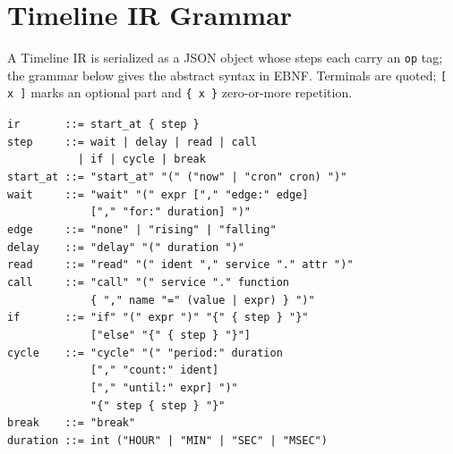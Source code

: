\documentclass[sigconf,nonacm,anonymous,review]{acmart}
\begin{document}
\balance



\appendix

\section{Timeline IR Grammar}
\label{app:grammar}

A Timeline IR is serialized as a JSON object whose steps each carry an \texttt{op} tag; the grammar below gives the abstract syntax in EBNF. Terminals are quoted; \texttt{[\,x\,]} marks an optional part and \texttt{\{\,x\,\}} zero-or-more repetition.

{\small
\begin{flushleft}
\texttt{ir \ \ \ \ \ \ ::= start\_at \{ step \}}\\
\texttt{step \ \ \ \ ::= wait | delay | read | call}\\
\texttt{\ \ \ \ \ \ \ \ \ \ \ | if | cycle | break}\\[3pt]
\texttt{start\_at ::= "start\_at" "(" ("now" | "cron" cron) ")"}\\
\texttt{wait \ \ \ \ ::= "wait" "(" expr ["," "edge:" edge]}\\
\texttt{\ \ \ \ \ \ \ \ \ \ \ \ \ ["," "for:" duration] ")"}\\
\texttt{edge \ \ \ \ ::= "none" | "rising" | "falling"}\\
\texttt{delay \ \ \ ::= "delay" "(" duration ")"}\\
\texttt{read \ \ \ \ ::= "read" "(" ident "," service "." attr ")"}\\
\texttt{call \ \ \ \ ::= "call" "(" service "." function}\\
\texttt{\ \ \ \ \ \ \ \ \ \ \ \ \ \{ "," name "=" (value | expr) \} ")"}\\
\texttt{if \ \ \ \ \ \ ::= "if" "(" expr ")" "\{" \{ step \} "\}"}\\
\texttt{\ \ \ \ \ \ \ \ \ \ \ \ \ ["else" "\{" \{ step \} "\}"]}\\
\texttt{cycle \ \ \ ::= "cycle" "(" "period:" duration}\\
\texttt{\ \ \ \ \ \ \ \ \ \ \ \ \ ["," "count:" ident]}\\
\texttt{\ \ \ \ \ \ \ \ \ \ \ \ \ ["," "until:" expr] ")"}\\
\texttt{\ \ \ \ \ \ \ \ \ \ \ \ \ "\{" step \{ step \} "\}"}\\
\texttt{break \ \ \ ::= "break"}\\[3pt]
\texttt{duration ::= int ("HOUR" | "MIN" | "SEC" | "MSEC")}\\[3pt]

\end{flushleft}}
\end{document}
